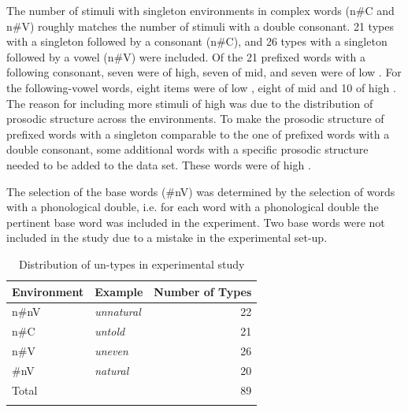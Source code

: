 The number of stimuli with singleton environments in complex words (n\#C and n\#V) roughly matches the number of stimuli with a double consonant. 21 types with a  singleton followed by a consonant ({n\#C}), and 26 types with a singleton followed by a vowel ({n\#V}) were included. 
Of the 21 prefixed words with a following consonant, seven were of high, seven of mid, and seven were of low .
For the following-vowel words, eight items were of low , eight of mid  and 10 of high . The reason for including more stimuli of high  was due to the distribution of prosodic structure across the environments. To make the prosodic structure of prefixed words with a singleton comparable to the one of prefixed words with a double consonant, some additional words with a specific prosodic structure needed to be added to the data set. These words were of high .




The selection of the base words ({\#nV}) was determined by the selection of words with a phonological double, i.e.  for each word with a phonological double the pertinent base word was included in the experiment. Two base words were not included in the study due to a mistake in the experimental set-up. 





\begin{table}
	\caption{Distribution of  {un}-types in experimental study}
	\label{tbl:distribution of un types in experiment}

	
		\begin{tabular} {llr}
\lsptoprule
			Environment & Example & Number of  Types\\

			\midrule
			n\#nV&\color{lsMidBlue}\textit{unnatural} & 22\\ 
			n\#C&\color{lsMidBlue}\textit{untold} & 21\\ 
			n\#V&\color{lsMidBlue}\textit{uneven} & 26 \\
			\#nV&\color{lsMidBlue}\textit{natural} & 20 \\ 
			\midrule
			Total&  & 89 \\ 
			\lspbottomrule                                                                                
		\end{tabular}
		

	
\end{table}



